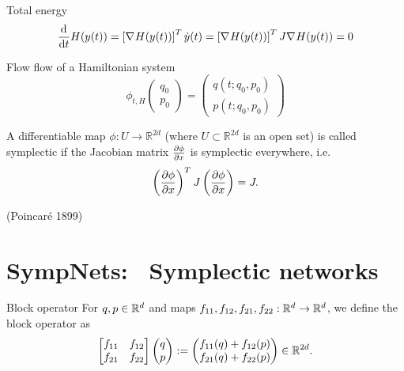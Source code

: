 \begin{frame}[c]{Total energy}
  \centering
  \begin{equation*}
    \frac{\mathrm{d}^{}}{\mathrm{d}t} H(y(t)) = \left[ \nabla_{}{H}(y(t)) \right]^T \dot{y}(t) = 
    \left[ \nabla_{}{H}(y(t)) \right]^T J \nabla_{}{H}(y(t)) = 0
  \end{equation*}
\end{frame}

\begin{frame}{Flow}
  flow of a Hamiltonian system
  \begin{equation*}
    \phi_{t,H}\begin{pmatrix}
      q_0 \\
      p_0
    \end{pmatrix}
    = \begin{pmatrix}
      q(t; q_0, p_0) \\
      p(t; q_0, p_0)
    \end{pmatrix}
  \end{equation*}

  \begin{definition}
    A differentiable map $\phi : U \to \mathbb{R}^{2d}$ (where $U \subset \mathbb{R}^{2d}$ is an open set)
    is called symplectic if the Jacobian matrix $\frac{\partial \phi}{\partial x}$ is symplectic everywhere, i.e.
    \begin{equation*}
      \left( \frac{\partial \phi}{\partial x} \right)^T J \left( \frac{\partial \phi}{\partial x} \right) = J
      .
    \end{equation*}
  \end{definition}

   (Poincaré 1899)
\end{frame}

\section{SympNets: ~\newline Symplectic networks}

\begin{frame}[c]{Block operator}
  For $q,p \in \mathbb{R}^{d}$ and maps $f_{11}, f_{12}, f_{21}, f_{22} : \mathbb{R}^d \to \mathbb{R}^d$,
  we define the block operator as
  \begin{equation*}
    \begin{bmatrix}
      f_{11} & f_{12} \\
      f_{21} & f_{22}
    \end{bmatrix}
    \begin{pmatrix} q \\ p \end{pmatrix}
    := \begin{pmatrix}
      f_{11}(q) + f_{12}(p) \\
      f_{21}(q) + f_{22}(p)
    \end{pmatrix} \in \mathbb{R}^{2d}
    .
  \end{equation*}
\end{frame}

